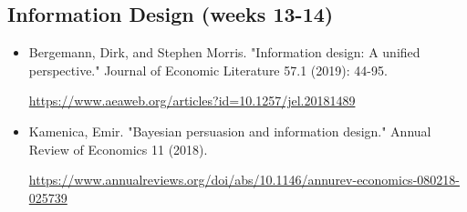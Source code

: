 \documentclass{article}
\begin{document}
\subsection{Information Design (weeks 13-14)}
\begin{itemize}
	\item Bergemann, Dirk, and Stephen Morris. "Information design: A unified perspective." Journal of Economic Literature 57.1 (2019): 44-95. 
	
	\url{https://www.aeaweb.org/articles?id=10.1257/jel.20181489}
	\item Kamenica, Emir. "Bayesian persuasion and information design." Annual Review of Economics 11 (2018).
	
	\url{https://www.annualreviews.org/doi/abs/10.1146/annurev-economics-080218-025739}
\end{itemize}



\end{document}
